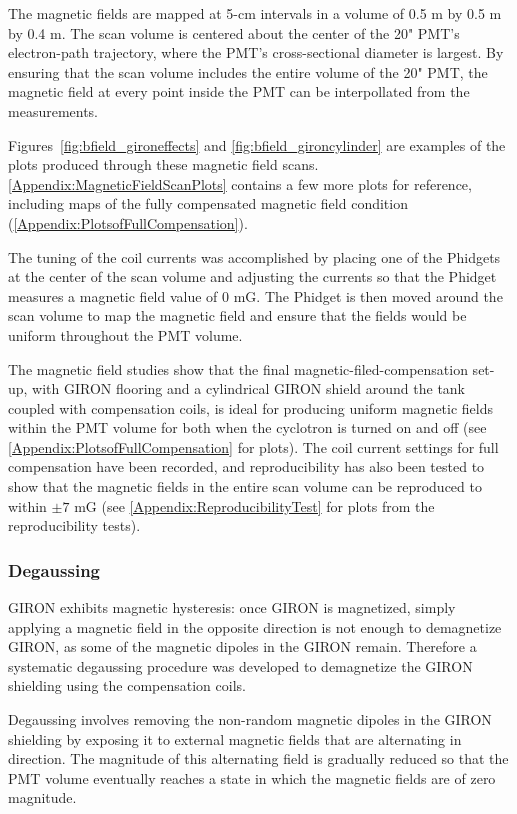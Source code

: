 The magnetic fields are mapped at 5-cm intervals in a volume of 0.5 m by 0.5 m by 0.4 m. The scan volume is centered about the center of the 20" PMT's electron-path trajectory, where the PMT's cross-sectional diameter is largest. By ensuring that the scan volume includes the entire volume of the 20" PMT, the magnetic field at every point inside the PMT can be interpollated from the measurements.

Figures~\ref{fig:bfield_gironeffects} and \ref{fig:bfield_gironcylinder} are examples of the plots produced through these magnetic field scans. \ref{Appendix:MagneticFieldScanPlots} contains a few more plots for reference, including maps of the fully compensated magnetic field condition (\ref{Appendix:PlotsofFullCompensation}).

The tuning of the coil currents was accomplished by placing one of the Phidgets at the center of the scan volume and adjusting the currents so that the Phidget measures a magnetic field value of 0 mG. The Phidget is then moved around the scan volume to map the magnetic field and ensure that the fields would be uniform throughout the PMT volume.

The magnetic field studies show that the final magnetic-filed-compensation set-up, with GIRON flooring and a cylindrical GIRON shield around the tank coupled with compensation coils, is ideal for producing uniform magnetic fields within the PMT volume for both when the cyclotron is turned on and off (see \ref{Appendix:PlotsofFullCompensation} for plots). The coil current settings for full compensation have been recorded, and reproducibility has also been tested to show that the magnetic fields in the entire scan volume can be reproduced to within $\pm7$ mG (see \ref{Appendix:ReproducibilityTest} for plots from the reproducibility tests).


\subsubsection{Degaussing}

GIRON exhibits magnetic hysteresis: once GIRON is magnetized, simply applying a magnetic field in the opposite direction is not enough to demagnetize GIRON, as some of the magnetic dipoles in the GIRON remain. Therefore a systematic degaussing procedure was developed to demagnetize the GIRON shielding using the compensation coils.

Degaussing involves removing the non-random magnetic dipoles in the GIRON shielding by exposing it to external magnetic fields that are alternating in direction. The magnitude of this alternating field is gradually reduced so that the PMT volume eventually reaches a state in which the magnetic fields are of zero magnitude.

